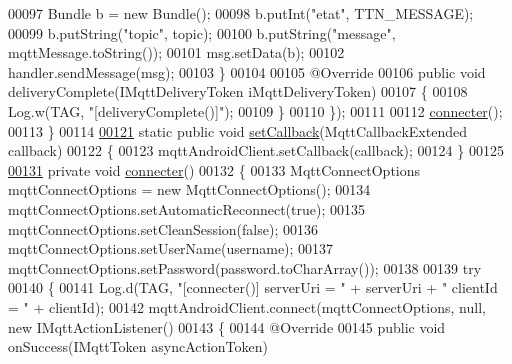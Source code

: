 \begin{DoxyCode}
00097                 Bundle b = \textcolor{keyword}{new} Bundle();
00098                 b.putInt(\textcolor{stringliteral}{"etat"}, TTN\_MESSAGE);
00099                 b.putString(\textcolor{stringliteral}{"topic"}, topic);
00100                 b.putString(\textcolor{stringliteral}{"message"}, mqttMessage.toString());
00101                 msg.setData(b);
00102                 handler.sendMessage(msg);
00103             \}
00104 
00105             @Override
00106             \textcolor{keyword}{public} \textcolor{keywordtype}{void} deliveryComplete(IMqttDeliveryToken iMqttDeliveryToken)
00107             \{
00108                 Log.w(TAG, \textcolor{stringliteral}{"[deliveryComplete()]"});
00109             \}
00110         \});
00111 
00112         \hyperlink{classcom_1_1example_1_1bee__honeyt_1_1_communication_aadc176b28bce357bf655d0feec024013}{connecter}();
00113     \}
00114 
\hyperlink{classcom_1_1example_1_1bee__honeyt_1_1_communication_a86faf903d7d230a0105b29e5c1d5f4a2}{00121}     \textcolor{keyword}{static} \textcolor{keyword}{public} \textcolor{keywordtype}{void} \hyperlink{classcom_1_1example_1_1bee__honeyt_1_1_communication_a86faf903d7d230a0105b29e5c1d5f4a2}{setCallback}(MqttCallbackExtended callback)
00122     \{
00123         mqttAndroidClient.setCallback(callback);
00124     \}
00125 
\hyperlink{classcom_1_1example_1_1bee__honeyt_1_1_communication_aadc176b28bce357bf655d0feec024013}{00131}     \textcolor{keyword}{private} \textcolor{keywordtype}{void} \hyperlink{classcom_1_1example_1_1bee__honeyt_1_1_communication_aadc176b28bce357bf655d0feec024013}{connecter}()
00132     \{
00133         MqttConnectOptions mqttConnectOptions = \textcolor{keyword}{new} MqttConnectOptions();
00134         mqttConnectOptions.setAutomaticReconnect(\textcolor{keyword}{true});
00135         mqttConnectOptions.setCleanSession(\textcolor{keyword}{false});
00136         mqttConnectOptions.setUserName(username);
00137         mqttConnectOptions.setPassword(password.toCharArray());
00138 
00139         \textcolor{keywordflow}{try}
00140         \{
00141             Log.d(TAG, \textcolor{stringliteral}{"[connecter()] serverUri = "} + serverUri + \textcolor{stringliteral}{" clientId = "} + clientId);
00142             mqttAndroidClient.connect(mqttConnectOptions, null, \textcolor{keyword}{new} IMqttActionListener()
00143             \{
00144                 @Override
00145                 \textcolor{keyword}{public} \textcolor{keywordtype}{void} onSuccess(IMqttToken asyncActionToken)

\end{DoxyCode}
